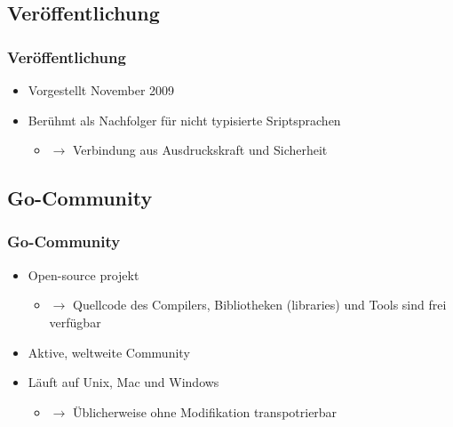 \documentclass{beamer}
\begin{document}
\subsection{Ver\"offentlichung}
\begin{frame}
\frametitle{Ver\"offentlichung}

\begin{itemize}
\setlength{\itemsep}{60pt}
\item Vorgestellt November 2009
\item Ber\"uhmt als Nachfolger für nicht typisierte Sriptsprachen
\begin{itemize}
\item[] $\rightarrow$ Verbindung aus Ausdruckskraft und Sicherheit
\end{itemize}
\end{itemize}

\end{frame}

\subsection{Go-Community}
\begin{frame}
\frametitle{Go-Community}

\begin{itemize}
\setlength{\itemsep}{44pt}
\item Open-source projekt
\begin{itemize}
\item[] $\rightarrow$ Quellcode des Compilers, Bibliotheken (libraries) und Tools sind frei verfügbar
\end{itemize}
\item Aktive, weltweite Community
\item L\"auft auf Unix, Mac und Windows
\begin{itemize}
\item[] $\rightarrow$ \"Ublicherweise ohne Modifikation transpotrierbar
\end{itemize}
\end{itemize}

\end{frame}
\end{document}
